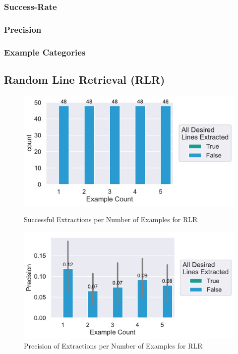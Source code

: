 \documentclass[\myrootdir/main.tex]{subfiles}
\begin{document}
\subsubsection{Success-Rate}
\subsubsection{Precision}
\subsubsection{Example Categories}


\subsection{Random Line Retrieval (RLR)}

\begin{figure}[htbp]
	\centering
	\begin{minipage}{0.45\textwidth}
		\centering
		\includegraphics[width=\textwidth, clip]{img/big-study/success-examples-RLR.pdf}
		\caption{Successful Extractions per Number of Examples for RLR}
		\label{fig:success-examples-rlr}
	\end{minipage}\hfill
	\begin{minipage}{0.45\textwidth}
		\centering
		\includegraphics[width=\textwidth, clip]{img/big-study/precision-RLR.pdf}
		\caption{Precision of Extractions per Number of Examples for RLR}
		\label{fig:precision-rlr}
	\end{minipage}
\end{figure}
\end{document}

